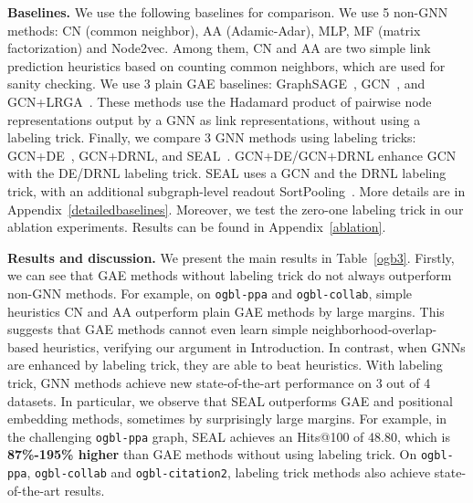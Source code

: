 \documentclass{article}
\begin{document}
\textbf{Baselines.} We use the following baselines for comparison. We use 5 non-GNN methods: CN (common neighbor), AA (Adamic-Adar), MLP, MF (matrix factorization) and Node2vec. Among them, CN and AA are two simple link prediction heuristics based on counting common neighbors, which are used for sanity checking. We use 3 plain GAE baselines: GraphSAGE~\citep{hamilton2017inductive}, GCN~\citep{kipf2016variational}, and GCN+LRGA~\citep{puny2020graph}. These methods use the Hadamard product of pairwise node representations output by a GNN as link representations, without using a labeling trick. Finally, we compare 3 GNN methods using labeling tricks: GCN+DE~\citep{li2020distance}, GCN+DRNL, and SEAL~\citep{zhang2018link}. GCN+DE/GCN+DRNL enhance GCN with the DE/DRNL labeling trick. SEAL uses a GCN and the DRNL labeling trick, with an additional subgraph-level readout SortPooling~\citep{zhang2018end}. More details are in Appendix~\ref{detailedbaselines}. Moreover, we test the zero-one labeling trick in our ablation experiments. Results can be found in Appendix~\ref{ablation}.



\textbf{Results and discussion.} We present the main results in Table~\ref{ogb3}. Firstly, we can see that GAE methods without labeling trick do not always outperform non-GNN methods. For example, on \texttt{ogbl-ppa} and \texttt{ogbl-collab}, simple heuristics CN and AA outperform plain GAE methods by large margins. This suggests that GAE methods cannot even learn simple neighborhood-overlap-based heuristics, verifying our argument in Introduction. In contrast, when GNNs are enhanced by labeling trick, they are able to beat heuristics. With labeling trick, GNN methods achieve new state-of-the-art performance on 3 out of 4 datasets. In particular, we observe that SEAL outperforms GAE and positional embedding methods, sometimes by surprisingly large margins. For example, in the challenging \texttt{ogbl-ppa} graph, SEAL achieves an Hits@100 of 48.80, which is \textbf{87\%-195\% higher} than GAE methods without using labeling trick. On \texttt{ogbl-ppa}, \texttt{ogbl-collab} and \texttt{ogbl-citation2}, labeling trick methods also achieve state-of-the-art results.
\end{document}
